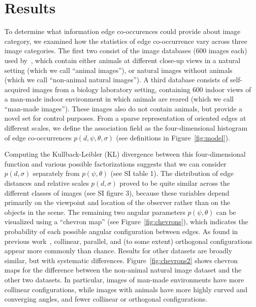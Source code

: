 \documentclass{article}%
\begin{document}
\section*{Results} %
To determine what information edge co-occurences could provide
about image category, we examined how the statistics of
edge co-occurrence vary across three image categories.
The first two consist of the image databases ($600$ images each) used by~\citet{Serre07}, 
which contain either animals at different close-up views in a natural setting (which we call ``animal images''), 
or natural images without animals (which we call ``non-animal natural images''). %
A third database consists of 
self-acquired images from a biology laboratory setting, 
containing $600$ indoor 
views of a man-made indoor environment 
in which animals are reared (which we call ``man-made images''). 
These images also do not contain animals, 
but provide a novel set for control purposes. %
From a sparse representation of oriented edges at different scales, we
define the association field as the four-dimensional histogram of edge
co-occurrences $p(d, \psi, \theta, \sigma)$ (see
definitions in Figure~\ref{fig:model}). %

Computing the Kullback-Leibler (KL) divergence between this
four-dimensio\-nal function and various possible factorizations suggests
that we can consider $p(d,\sigma)$ separately from $p(\psi, \theta)$
(see SI table 1).  The distribution of edge distances and relative scales
$p(d,\sigma)$ proved to be quite similar across the different classes
of images (see SI figure 3), because these variables depend
primarily on the viewpoint and location of the observer rather than on
the objects in the scene.  The remaining two angular parameters
$p(\psi, \theta)$ can be visualized using a ``chevron map'' (see
Figure~\ref{fig:chevrons}), %
which indicates the probability of each possible angular configuration
between edges.  As found in previous work~\citep{Geisler01},
collinear, parallel, and (to some extent) orthogonal configurations
appear more commonly than chance.  Results for other datasets are
broadly similar, but with systematic differences.
Figure~\ref{fig:chevrons2} shows chevron maps for the difference
between the non-animal natural image dataset and the other two datasets.
In particular, images of man-made environments have more collinear
configurations, while images with animals have more highly curved and
converging angles, and fewer collinear or orthogonal configurations.
\end{document}
